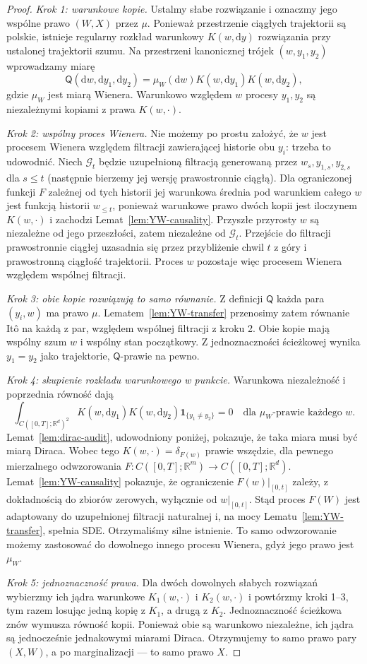 \documentclass[11pt,a4paper,oneside]{report}
\numberwithin{equation}{chapter}
\theoremstyle{plain}
\theoremstyle{definition}
\theoremstyle{remark}
\newcommand{\R}{\mathbb{R}}
\newcommand{\calG}{\mathcal{G}}
\newcommand{\ind}[1]{\mathbf{1}_{#1}}
\newcommand{\dd}{\mathrm{d}}
\begin{document}
\begin{proof}
\emph{Krok 1: warunkowe kopie.} Ustalmy słabe rozwiązanie
i oznaczmy jego wspólne prawo $(W,X)$ przez $\mu$.
Ponieważ przestrzenie ciągłych trajektorii są polskie,
istnieje regularny rozkład warunkowy $K(w,\dd y)$
rozwiązania przy ustalonej trajektorii szumu.
Na przestrzeni kanonicznej trójek $(w,y_1,y_2)$
wprowadzamy miarę
\[
 \mathsf Q(\dd w,\dd y_1,\dd y_2)
 =\mu_W(\dd w)K(w,\dd y_1)K(w,\dd y_2),
\]
gdzie $\mu_W$ jest miarą Wienera. Warunkowo względem
$w$ procesy $y_1,y_2$ są niezależnymi kopiami z prawa
$K(w,\cdot)$.

\emph{Krok 2: wspólny proces Wienera.} Nie możemy po prostu
założyć, że $w$ jest procesem Wienera względem filtracji
zawierającej historie obu $y_i$: trzeba to udowodnić.
Niech $\calG_t$ będzie uzupełnioną filtracją generowaną
przez $w_s,y_{1,s},y_{2,s}$ dla $s\le t$ (następnie bierzemy
jej wersję prawostronnie ciągłą). Dla ograniczonej funkcji
$F$ zależnej od tych historii jej warunkowa średnia pod
warunkiem całego $w$ jest funkcją historii $w_{\le t}$,
ponieważ warunkowe prawo dwóch kopii jest iloczynem
$K(w,\cdot)$ i zachodzi Lemat~\ref{lem:YW-causality}.
Przyszłe przyrosty $w$ są niezależne od jego przeszłości,
zatem niezależne od $\calG_t$. Przejście do filtracji
prawostronnie ciągłej uzasadnia się przez przybliżenie
chwil $t$ z góry i prawostronną ciągłość trajektorii.
Proces $w$ pozostaje więc procesem Wienera względem
wspólnej filtracji.

\emph{Krok 3: obie kopie rozwiązują to samo równanie.}
Z definicji $\mathsf Q$ każda para $(y_i,w)$ ma prawo
$\mu$. Lematem~\ref{lem:YW-transfer} przenosimy zatem
równanie Itô na każdą z par, względem wspólnej filtracji
z kroku 2. Obie kopie mają wspólny szum $w$ i wspólny
stan początkowy. Z jednoznaczności ścieżkowej wynika
$y_1=y_2$ jako trajektorie, $\mathsf Q$-prawie na pewno.

\emph{Krok 4: skupienie rozkładu warunkowego w punkcie.}
Warunkowa niezależność i poprzednia równość dają
\[
 \int_{C([0,T];\R^d)^2} K(w,\dd y_1)K(w,\dd y_2)
 \ind{\{y_1\ne y_2\}}=0
 \quad\text{dla }\mu_W\text{-prawie każdego }w.
\]
Lemat~\ref{lem:dirac-audit}, udowodniony poniżej,
pokazuje, że taka miara musi być miarą Diraca.
Wobec tego $K(w,\cdot)=\delta_{F(w)}$ prawie wszędzie,
dla pewnego mierzalnego odwzorowania
$F:C([0,T];\R^m)\to C([0,T];\R^d)$.
Lemat~\ref{lem:YW-causality} pokazuje, że ograniczenie
$F(w)|_{[0,t]}$ zależy, z dokładnością do zbiorów zerowych,
wyłącznie od $w|_{[0,t]}$. Stąd proces $F(W)$ jest
adaptowany do uzupełnionej filtracji naturalnej i,
na mocy Lematu~\ref{lem:YW-transfer}, spełnia SDE.
Otrzymaliśmy silne istnienie. To samo odwzorowanie możemy
zastosować do dowolnego innego procesu Wienera, gdyż jego
prawo jest $\mu_W$.

\emph{Krok 5: jednoznaczność prawa.} Dla dwóch dowolnych
słabych rozwiązań wybierzmy ich jądra warunkowe
$K_1(w,\cdot)$ i $K_2(w,\cdot)$ i powtórzmy kroki 1--3,
tym razem losując jedną kopię z $K_1$, a drugą z $K_2$.
Jednoznaczność ścieżkowa znów wymusza równość kopii.
Ponieważ obie są warunkowo niezależne, ich jądra są
jednocześnie jednakowymi miarami Diraca. Otrzymujemy
to samo prawo pary $(X,W)$, a po marginalizacji ---
to samo prawo $X$.
\end{proof}
\end{document}
